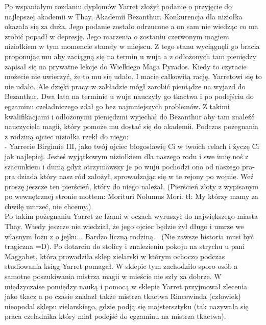 \documentclass{article}
\begin{document}
    Po wspaniałym rozdaniu dyplomów Yarret złożył podanie o przyjęcie do najlepszej akademii w Thay, Akademii Bezanthur. Konkurencja dla niziołka okazała się za duża. Jego podanie zostało odrzucone a on sam nie wiedząc co ma zrobić popadł w depresję. Jego marzenia o zostaniu czerwonym magiem niziołkiem w tym momencie staneły w miejscu. Z tego stanu wyciągnęli go bracia proponując mu aby zaciągną się na termin u wuja a z odłożonych tam pieniędzy zapisał się na prywatne lekcje do Wielkiego Maga Pyrados. Kiedy to czytacie możecie nie uwierzyć, że to mu się udało. I macie całkowitą rację. Yarretowi się to nie udało. Ale dzięki pracy w zakładzie mógł zarobić pieniądze na wyjazd do Bezanthur. Dwa lata na terminie u wuja nauczyły go tkactwa i po podejściu do egzaminu czeladniczego zdał go bez najmniejszych problemów. Z takimi kwalifikacjami i odłożonymi pieniędzmi wyjechał do Bezanthur aby tam znaleźć nauczyciela magii, który pomoże mu dostać się do akademii. Podczas pożegnania z rodziną ojciec niziołka rzekł do niego:\\

    - Yarrecie Birgimie III,  jako twój ojciec błogosławię Ci w twoich celach i życzę Ci jak najlepiej. Jesteś wyjątkowym niziołkiem dla naszego rodu i swe imię noś z szacunkiem i dumą gdyż otrzymawszy je po wuju pochodzi ono od naszego pra-pra dziada który nasz ród założył, sprowadzając się w te rejony po wojnie. Weź proszę jeszcze ten pierścień, który do niego należał. (Pierścień złoty z wypisanym po wewnętrznej stronie mottem: Morituri Nolumus Mori. tł: My którzy mamy za chwilę umrzeć, nie chcemy.)\\

    Po takim pożegnaniu Yarret ze łzami w oczach wyruszył do największego miasta Thay. Wtedy jeszcze nie wiedział, że jego ojciec będzie żył długo i umrze we własnym łożu z o jejku... Bardzo liczną rodziną... (Nie zawsze historia musi być tragiczna =D). Po dotarciu do stolicy i znalezieniu pokoju na strychu u pani Maggabet, która prowadziła sklep zielarski w którym ochoczo podczas studiowania ksiąg Yarret pomagał. W sklepie tym zachodziło sporo osób a samotne poszukiwania mistrza magii w mieście nie szły za dobrze. W międzyczaise pomiędzy nauką i pomocą w sklepie Yarret przyjmował zlecenia jako tkacz a po czasie znalazł także mistrza tkactwa Rincewinda (człowiek) nieopodal sklepu zielarskiego, gdzie podją się majstersztyku (tak nazywała się praca czeladnika który miał podejść do egzaminu na mistrza tkactwa).\\
\end{document}
